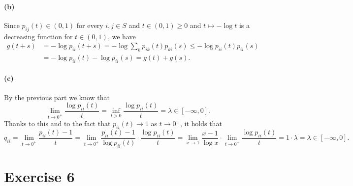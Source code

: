 \documentclass[a4paper,11pt]{article}
\theoremstyle{definition}
\theoremstyle{plain}
\theoremstyle{remark}
\begin{document}
\paragraph*{(b)} 

Since $p_{ij}(t)\in(0,1)$ for every $i,j\in S$ and $t\in(0,1)\geq 0$ and $t\mapsto -\log t$ is a decreasing function for $t\in(0,1)$, we have
\begin{align*}
g(t+s) & = -\log p_{ii}(t+s) = -\log \sum_kp_{ik}(t)p_{ki}(s) \leq -\log p_{ii}(t)p_{ii}(s) \\ & = -\log p_{ii}(t)-\log p_{ii}(s) = g(t)+g(s).
\end{align*}

\paragraph*{(c)}

By the previous part we know that
$$
\lim_{t\to0^+}\frac{\log p_{ii}(t)}{t} = \inf_{t>0}\frac{\log p_{ii}(t)}{t} = \lambda \in [-\infty,0].
$$
Thanks to this and to the fact that $p_{ii}(t)\to 1$ as $t\to0^+$, it holds that
$$
q_{ii}=\lim_{t\to0^+}\frac{p_{ii}(t)-1}{t} = \lim_{t\to0^+}\frac{p_{ii}(t)-1}{\log p_{ii}(t)}\cdot\frac{\log p_{ii}(t)}{t} = \lim_{x\to1}\frac{x-1}{\log x}\cdot\lim_{t\to0^+}\frac{\log p_{ii}(t)}{t} = 1\cdot\lambda = \lambda  \in [-\infty,0].
$$

\section*{Exercise 6}
\end{document}
